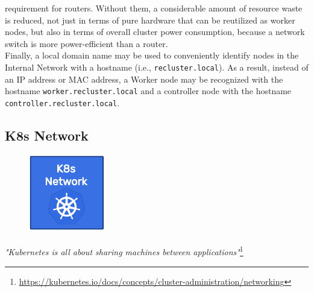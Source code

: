 requirement for routers. Without them, a considerable amount of resource waste
is reduced, not just in terms of pure hardware that can be reutilized as worker nodes,
but also in terms of overall cluster power consumption, because a network switch
is more power-efficient than a router\cite{switch_vs_router_power_consumption}. \\ %
Finally, a local domain name may be used to conveniently identify nodes in the Internal
Network with a hostname (i.e., \texttt{recluster.local})\cite{rfc_2606}. As a
result, instead of an IP address or MAC address, a Worker node may be recognized
with the hostname \texttt{worker.recluster.local} and a controller node with the
hostname \texttt{controller.recluster.local}.

\subsection{K8s Network}
\label{subsec:architecture_network_k8s_network}

\begin{figure}
  \centering
  \includegraphics[width=\linewidth]{images/architecture/k8s_network.pdf}
\end{figure}

\textit{"Kubernetes is all about sharing machines between applications"}\footnote{\url{https://kubernetes.io/docs/concepts/cluster-administration/networking}}
\\ %


